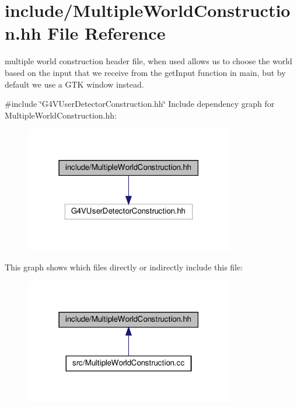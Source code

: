 \hypertarget{MultipleWorldConstruction_8hh}{}\section{include/\+Multiple\+World\+Construction.hh File Reference}
\label{MultipleWorldConstruction_8hh}


multiple world construction header file, when used allows us to choose the world based on the input that we receive from the get\+Input function in main, but by default we use a G\+TK window instead.  


{\ttfamily \#include \char`\"{}G4\+V\+User\+Detector\+Construction.\+hh\char`\"{}}\newline
Include dependency graph for Multiple\+World\+Construction.\+hh\+:
\nopagebreak
\begin{figure}[H]
\begin{center}
\leavevmode
\includegraphics[width=259pt]{MultipleWorldConstruction_8hh__incl}
\end{center}
\end{figure}
This graph shows which files directly or indirectly include this file\+:
\nopagebreak
\begin{figure}[H]
\begin{center}
\leavevmode
\includegraphics[width=259pt]{MultipleWorldConstruction_8hh__dep__incl}
\end{center}
\end{figure}

